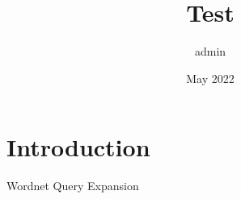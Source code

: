 \documentclass{article}
\title{Test}
\author{admin }
\date{May 2022}
\begin{document}
\maketitle

\section{Introduction}
Wordnet Query Expansion
\end{document}
